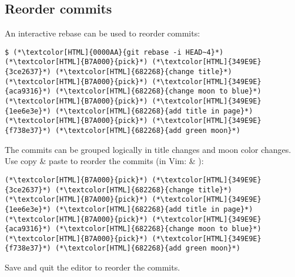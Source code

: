 \subsection{Reorder commits}
\begin{frame}[fragile]
  \subslidetitle
  An interactive rebase can be used to reorder commits:

  \begin{lstlisting}
$ (*\textcolor[HTML]{0000AA}{git rebase -i HEAD~4}*)
(*\textcolor[HTML]{B7A000}{pick}*) (*\textcolor[HTML]{349E9E}{3ce2637}*) (*\textcolor[HTML]{682268}{change title}*)
(*\textcolor[HTML]{B7A000}{pick}*) (*\textcolor[HTML]{349E9E}{aca9316}*) (*\textcolor[HTML]{682268}{change moon to blue}*)
(*\textcolor[HTML]{B7A000}{pick}*) (*\textcolor[HTML]{349E9E}{1ee6e3e}*) (*\textcolor[HTML]{682268}{add title in page}*)
(*\textcolor[HTML]{B7A000}{pick}*) (*\textcolor[HTML]{349E9E}{f738e37}*) (*\textcolor[HTML]{682268}{add green moon}*)
\end{lstlisting}

  The commits can be grouped logically in title changes and moon color changes.\\
  Use copy \& paste to reorder the commits (in Vim:  \& ):

  \begin{lstlisting}
(*\textcolor[HTML]{B7A000}{pick}*) (*\textcolor[HTML]{349E9E}{3ce2637}*) (*\textcolor[HTML]{682268}{change title}*)
(*\textcolor[HTML]{B7A000}{pick}*) (*\textcolor[HTML]{349E9E}{1ee6e3e}*) (*\textcolor[HTML]{682268}{add title in page}*)
(*\textcolor[HTML]{B7A000}{pick}*) (*\textcolor[HTML]{349E9E}{aca9316}*) (*\textcolor[HTML]{682268}{change moon to blue}*)
(*\textcolor[HTML]{B7A000}{pick}*) (*\textcolor[HTML]{349E9E}{f738e37}*) (*\textcolor[HTML]{682268}{add green moon}*)
\end{lstlisting}

  Save and quit the editor to reorder the commits.
\end{frame}


